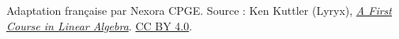 \documentclass[11pt,a4paper]{article}
\begin{document}
\bigskip
{\footnotesize Adaptation française par Nexora CPGE. Source : Ken Kuttler (Lyryx),
\href{https://math.libretexts.org/Bookshelves/Linear_Algebra/A_First_Course_in_Linear_Algebra_(Kuttler)/07\%253A_Spectral_Theory/7.02\%253A_Diagonalization}{\textit{A First Course in Linear Algebra}}.
\href{https://creativecommons.org/licenses/by/4.0/}{CC BY 4.0}.}
\end{document}
